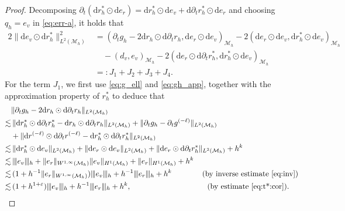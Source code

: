 \documentclass[10pt,a4paper]{amsart}
\newcommand{\Man}{\mathcal{M}}
\newcommand{\normt}[1]{%
	\vert\kern-0.9pt\vert\kern-0.9pt\vert #1
	\vert\kern-0.9pt\vert\kern-0.9pt\vert}
\begin{document}
\begin{proof}
Decomposing 
$ \partial_t( \mathrm{d} r_h^* \odot\mathrm{d} e_r) =  \mathrm{d} r_h^* \odot\mathrm{d} e_v 
+  \mathrm{d} \partial_t r_h^* \odot\mathrm{d} e_r $ and choosing $q_h = e_{v}$ in \eqref{eq:err-a}, 
it holds that
\[ 
\begin{aligned}
    2\|\mathrm{d} e_{v} \odot \mathrm{d} r_h^{*}\|_{L^2(\Man_h)}^2 
&=(\partial_t g_h - 2 \mathrm{d} r_h \odot \mathrm{d} \partial_t r_h, \mathrm{d} e_{r} \odot \mathrm{d} e_{v} )_{\Man_h}
- 2 ( \mathrm{d} e_{r} \odot \mathrm{d} e_{v}, \mathrm{d} r_h^{*} \odot \mathrm{d} e_{v} )_{\Man_h} \\
&\quad  - ( d_v, e_{v} )_{\Man_h}
- 2 ( \mathrm{d} e_{r} \odot \mathrm{d} \partial_t r_h^{*}, \mathrm{d} r_h^{*} \odot \mathrm{d} e_{v})_{\Man_h}\\ 
& =: J_1 + J_2 + J_3 + J_4.
\end{aligned}
\]
For the term $J_1$, we first use \eqref{eq:g_ell} and \eqref{eq:gh_app}, together with the approximation property of $r_h^*$ to deduce that 
\begin{equation}\label{eq:pt_gh-drhdrh} 
\begin{aligned}
   & \| \partial_t g_h - 2 \mathrm{d} r_h \odot \mathrm{d} \partial_t r_h \|_{L^2(\Man_h)} \\ 
 \lesssim &\, \|\mathrm{d}r_h^*\odot\mathrm{d}\partial_t r_h^* - \mathrm{d}r_h\odot\mathrm{d}\partial_t r_h\|_{L^2(\Man_h)} + \| \partial_t g_h -  \partial_t g^{(-\ell)}  \|_{L^2(\Man_h)} \\ 
 & + \| \mathrm{d}r^{(-\ell)}\odot\mathrm{d}\partial_t r^{(-\ell)}
 - \mathrm{d} r_h^* \odot \mathrm{d} \partial_t r_h^*\|_{L^2(\Man_h)} \\ 
\lesssim &\,  \| \mathrm{d} r_h^{*} \odot \mathrm{d} e_{v}  \|_{L^2(\Man_h)}
+ \|\mathrm{d} e_{r} \odot \mathrm{d} e_{v} \|_{L^2(\Man_h)} 
+ \|\mathrm{d} e_{r} \odot \mathrm{d} \partial_t r_h^{*}\|_{L^2(\Man_h)} + h^k \\ 
\lesssim & 
\, \normt{ e_v }_{h} + \| e_r \|_{W^{1,\infty}(\Man_h)} \| e_v \|_{H^1(\Man_h)} 
+ \| e_r \|_{H^1(\Man_h)} + h^k\\
\lesssim & \, 
(1 + h^{-1}\|e_r\|_{W^{1, \infty}(\Man_h)})\normt{ e_v }_{h} + h^{-1} \normt{e_r}_h + h^k 
\quad\quad\quad\quad (\text{by inverse estimate \eqref{eq:inv}})
\\ 
\lesssim &
\, (1 + h^{1+\varepsilon})\normt{ e_v }_{h} + h^{-1} \normt{e_r}_h + h^k,
\qquad\qquad\qquad\qquad\qquad
 (\text{by estimate \eqref{eq:t*:cor}}). 
\end{aligned}

\end{equation}
\end{proof}
\end{document}
